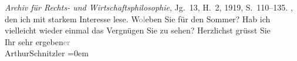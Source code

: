 \begin{ledgroupsized}[t]{13cm}
{{{                        \emph{Archiv für Rechts- und
                        Wirtschaftsphilosophie}, Jg. 13, H. 2, 1919, S. 110–135.
                  }}}\label{K_L02341-1h}, den ich mit starkem Interesse lese.\pend
           \pstart
           W\textcolor{gray}{o}\textcolor{gray}{l}eben Sie für den Sommer? Hab ich vielleicht wieder einmal das
               Vergnügen Sie zu sehen?\pend
           \pstart
           Herzlichst grüsst Sie{\\[\baselineskip]}Ihr sehr ergeben\textcolor{gray}{er}{\\[\baselineskip]}\spacefill\mbox{ArthurSchnitzler}\pend
           \leftskip=0em{}
         
         \endnumbering{}\end{ledgroupsized}  \newcommand{\dateiname}{L02341}\newcommand{\titel}{Arthur Schnitzler an Robert Adam, 12. 6. 1920}\newcommand{\editorInnen}{Martin Anton Müller und Gerd-Hermann Susen}
      